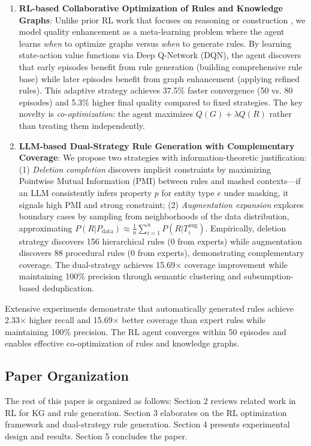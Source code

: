 \documentclass[runningheads]{llncs}
\begin{document}
\begin{enumerate}
    \item \textbf{RL-based Collaborative Optimization of Rules and Knowledge Graphs}: Unlike prior RL work that focuses on reasoning \cite{ref_das2018} or construction \cite{ref_chen2020}, we model quality enhancement as a meta-learning problem where the agent learns \textit{when} to optimize graphs versus \textit{when} to generate rules. By learning state-action value functions via Deep Q-Network (DQN), the agent discovers that early episodes benefit from rule generation (building comprehensive rule base) while later episodes benefit from graph enhancement (applying refined rules). This adaptive strategy achieves 37.5\% faster convergence (50 vs. 80 episodes) and 5.3\% higher final quality compared to fixed strategies. The key novelty is \textit{co-optimization}: the agent maximizes $Q(G) + \lambda Q(R)$ rather than treating them independently.

    \item \textbf{LLM-based Dual-Strategy Rule Generation with Complementary Coverage}: We propose two strategies with information-theoretic justification: (1) \textit{Deletion completion} discovers implicit constraints by maximizing Pointwise Mutual Information (PMI) between rules and masked contexts—if an LLM consistently infers property $p$ for entity type $e$ under masking, it signals high PMI and strong constraint; (2) \textit{Augmentation expansion} explores boundary cases by sampling from neighborhoods of the data distribution, approximating $P(R | P_{\text{data}}) \approx \frac{1}{n} \sum_{i=1}^{n} P(R | T_i^{\text{aug}})$. Empirically, deletion strategy discovers 156 hierarchical rules (0 from experts) while augmentation discovers 88 procedural rules (0 from experts), demonstrating complementary coverage. The dual-strategy achieves 15.69× coverage improvement while maintaining 100\% precision through semantic clustering and subsumption-based deduplication.
\end{enumerate}

Extensive experiments demonstrate that automatically generated rules achieve 2.33× higher recall and 15.69× better coverage than expert rules while maintaining 100\% precision. The RL agent converges within 50 episodes and enables effective co-optimization of rules and knowledge graphs.

\subsection{Paper Organization}
The rest of this paper is organized as follows: Section 2 reviews related work in RL for KG and rule generation. Section 3 elaborates on the RL optimization framework and dual-strategy rule generation. Section 4 presents experimental design and results. Section 5 concludes the paper.
\end{document}
